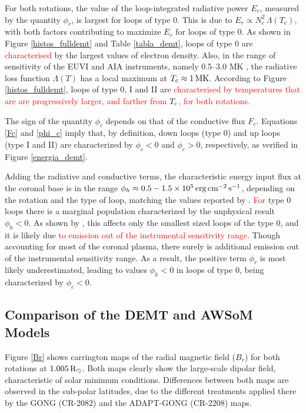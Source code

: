 \documentclass[namedreferences]{solarphysics}
\def\edit#1{\textcolor{Red}{#1}}
\newcommand{\mrsun}{{\rm R_\odot}}
\newcommand{\MK}{{\rm MK}}
\newcommand{\cm}{{\rm cm}}
\newcommand{\cminvs}{\cm^{-2}}
\newcommand{\erg}{{\rm erg}}
\newcommand{\s}{{\rm s}}
\newcommand{\Tc}{T_{\rm c}}
\begin{document}
\begin{article}
{For both rotations, the value of the {loop-integrated} radiative power $E_r$, measured by the quantity $\phi_r$, is largest for loops of type 0. This is due to $E_r\propto N_e^2\,\Lambda(T_e)$, with both factors contributing to maximize $E_r$ for loops of type 0. As shown in Figure \ref{histos_fulldemt} and Table \ref{tabla_demt}, loops of type 0 are \edit{characterised} by {the largest} values of electron density. Also, in the range of sensitivity of the EUVI and AIA instruments, namely 0.5–3.0 MK \citep{nuevo_2015}, the radiative loss function $\Lambda(T)$ has a local maximum at $\Tc\approx 1\,\MK$. According to Figure \ref{histos_fulldemt}, loops of type 0, I and II are \edit{characterised by temperatures that are are progressively larger, and farther from $\Tc$, for both rotations.}}

The sign of the quantity $\phi_c$ depends on that of the conductive flux $F_c$. Equations \ref{Fc} and \ref{phi_c} imply that, by definition, down loops (type 0) and up loops (type I and II) are characterized by $\phi_c<0$ and $\phi_c>0$, respectively, {as verified} in Figure \ref{energia_demt}.

{{Adding the} radiative and conductive terms, the characteristic energy input flux at the coronal base is in the range $\phi_h\approx 0.5-1.5 \times 10^5\,\erg\,\cminvs\,\s^{-1}$, depending on the rotation and the type of {loop, matching the values reported by} \citet{maccormack_2017}. \edit{For} type 0 loops there is a marginal population characterized by the unphysical result $\phi_h<0$. As shown by \citet{maccormack_2017}, this affects only the smallest sized loops of the type 0, and it is likely due \edit{to emission out of the instrumental sensitivity range}. Though accounting for most of the coronal plasma, there surely is additional emission out of the instrumental sensitivity range. As a result,} the positive term $\phi_r$ is most likely underestimated, leading to values $\phi_h<0$ in loops of type 0, {being characterized by $\phi_c<0$.}

\subsection{{Comparison of the DEMT and AWSoM Models}}\label{awsom_res} 

{Figure \ref{Br} shows carrington maps of {the radial} magnetic {field ($B_r$)} for both rotations at $1.005\, \mrsun$. {Both maps clearly show the large-scale dipolar field, characteristic of solar minimum conditions. Differences between both maps are observed in the sub-polar latitudes, due to the different treatments applied there by the GONG (CR-2082) and the ADAPT-GONG (CR-2208) maps.}}


\end{article}
\end{document}
